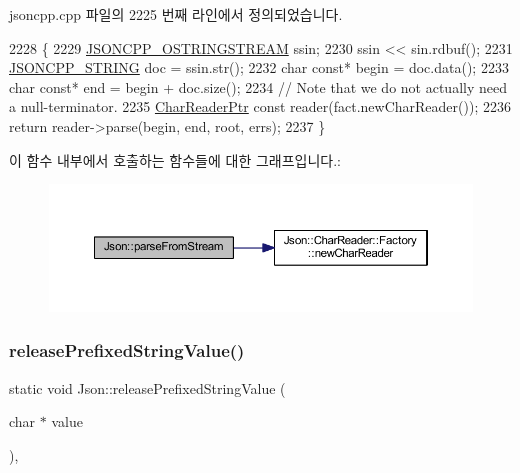 jsoncpp.\+cpp 파일의 2225 번째 라인에서 정의되었습니다.


\begin{DoxyCode}
2228 \{
2229   \hyperlink{json-forwards_8h_a1d06ac2ca63c8c521f41231dfda0e6b3}{JSONCPP\_OSTRINGSTREAM} ssin;
2230   ssin << sin.rdbuf();
2231   \hyperlink{json-forwards_8h_a1e723f95759de062585bc4a8fd3fa4be}{JSONCPP\_STRING} doc = ssin.str();
2232   \textcolor{keywordtype}{char} \textcolor{keyword}{const}* begin = doc.data();
2233   \textcolor{keywordtype}{char} \textcolor{keyword}{const}* end = begin + doc.size();
2234   \textcolor{comment}{// Note that we do not actually need a null-terminator.}
2235   \hyperlink{namespace_json_a4724efb8d41614b47036cb8b54233837}{CharReaderPtr} \textcolor{keyword}{const} reader(fact.newCharReader());
2236   \textcolor{keywordflow}{return} reader->parse(begin, end, root, errs);
2237 \}
\end{DoxyCode}
이 함수 내부에서 호출하는 함수들에 대한 그래프입니다.\+:\nopagebreak
\begin{figure}[H]
\begin{center}
\leavevmode
\includegraphics[width=350pt]{namespace_json_a38f903cfdb57a6c4e86a7dcc42f3712c_cgraph}
\end{center}
\end{figure}
\mbox{\label{namespace_json_a48f4e3ea655e3b4a5d7f892c81f00511}} 
\subsubsection{\texorpdfstring{release\+Prefixed\+String\+Value()}{releasePrefixedStringValue()}}
{\footnotesize\ttfamily static void Json\+::release\+Prefixed\+String\+Value (\begin{DoxyParamCaption}\item[{char $\ast$}]{value }\end{DoxyParamCaption})\hspace{0.3cm}{\ttfamily [inline]}, {\ttfamily [static]}}

